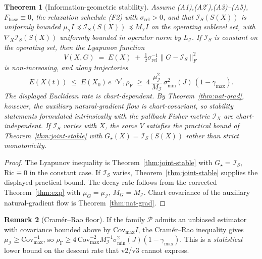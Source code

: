 \documentclass[11pt,oneside]{amsart}
\def\qquad{ }%
\theoremstyle{plain}
\newtheorem{theorem}{Theorem}[section]
\theoremstyle{definition}
\newtheorem{remark}[theorem]{Remark}
\newcommand{\Fbase}{F_{\mathrm{base}}}
\begin{document}
\begin{theorem}[Information-geometric stability]
\label{thm:fisher-stable}
Assume \textup{(A1),(A2$'$),(A3)--(A5)}, $\Fbase\equiv 0$, the
relaxation schedule \textup{(F2)} with $\sigma_{\mathrm{rel}}>0$, and
that $\mathcal{I}_{S}(S(X))$ is uniformly bounded
$\mu_{\mathcal{I}}I\preceq \mathcal{I}_{S}(S(X))\preceq M_{\mathcal{I}}I$ on
the operating sublevel set, with $\nabla_{X}\mathcal{I}_{S}(S(X))$ uniformly
bounded in operator norm by $L_{\mathcal{I}}$. If
$\mathcal{I}_{S}$ is constant on the operating set, then the Lyapunov
function
\[
  V(X,G) \;=\; E(X) \;+\; \tfrac{1}{2}\sigma_{\mathrm{rel}}^{-1}\|G-\mathcal{I}_{S}\|_{F}^{2}
\]
is non-increasing, and along trajectories
\[
  E(X(t)) \;\le\; E(X_{0})\,e^{-\rho_{\mathrm{F}} t},
  \qquad
  \rho_{\mathrm{F}} \;\ge\; 4\,\frac{\mu_{\mathcal{I}}^{2}}{M_{\mathcal{I}}}\,
         \sigma_{\min}^{2}(J)\,(1-\gamma_{\max}).
\]
The displayed Euclidean rate is chart-dependent. By
Theorem~\ref{thm:nat-grad}, however, the auxiliary natural-gradient
flow is chart-covariant, so stability statements formulated
intrinsically with the pullback Fisher metric $\mathcal{I}_{X}$ are
chart-independent.
If $\mathcal{I}_{S}$ varies with $X$, the same $V$ satisfies the
practical bound of Theorem~\ref{thm:joint-stable} with
$G_{\star}(X)=\mathcal{I}_{S}(S(X))$ rather than strict monotonicity.
\end{theorem}

\begin{proof}
The Lyapunov inequality is Theorem~\ref{thm:joint-stable} with
$G_{\star}=\mathcal{I}_{S}$, $\mathrm{Ric}\equiv 0$ in the constant case.
If $\mathcal{I}_{S}$ varies, Theorem~\ref{thm:joint-stable} supplies
the displayed practical bound. The decay rate follows from the
corrected Theorem~\ref{thm:exp} with
$\mu_{G}=\mu_{\mathcal{I}}$, $M_{G}=M_{\mathcal{I}}$. Chart
covariance of the auxiliary natural-gradient flow is
Theorem~\ref{thm:nat-grad}.
\end{proof}

\begin{remark}[Cram\'er--Rao floor]
If the family $\mathcal{P}$ admits an unbiased estimator with
covariance bounded above by $\mathrm{Cov}_{\max}I$, the Cram\'er--Rao
inequality gives $\mu_{\mathcal{I}}\ge \mathrm{Cov}_{\max}^{-1}$, so
$\rho_{\mathrm{F}}\ge 4\,\mathrm{Cov}_{\max}^{-2}M_{\mathcal{I}}^{-1}\sigma_{\min}^{2}(J)(1-\gamma_{\max})$.
This is a \emph{statistical} lower bound on the descent rate that
v2/v3 cannot express.
\end{remark}
\end{document}

